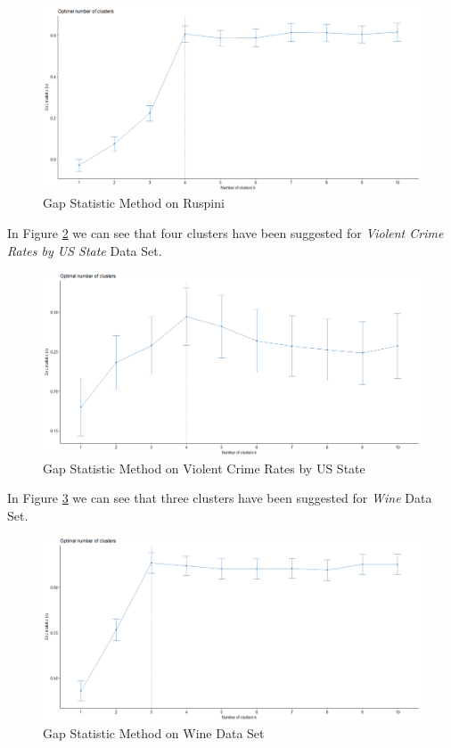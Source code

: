 \begin{itemize}
\begin{figure}[h!]
  \centering
  \includegraphics[scale=1.3]{figures/results/ruspini/gap.png}
  \caption{Gap Statistic Method on Ruspini}
  \label{fig:gap4}
\end{figure}

\vspace{15mm}

In Figure \ref{fig:gap5} we can see that four clusters have been suggested for \textit{Violent Crime Rates by US State} Data Set.

\begin{figure}[h!]
  \centering
  \includegraphics[scale=1.3]{figures/results/USArrests/gap.png}
  \caption{Gap Statistic Method on Violent Crime Rates by US State}
  \label{fig:gap5}
\end{figure}

\newpage

In Figure \ref{fig:gap6} we can see that three clusters have been suggested for \textit{Wine} Data Set.

\begin{figure}[h!]
  \centering
  \includegraphics[scale=1.3]{figures/results/wine/gap.png}
  \caption{Gap Statistic Method on Wine Data Set}
  \label{fig:gap6}
\end{figure}


\end{itemize}
